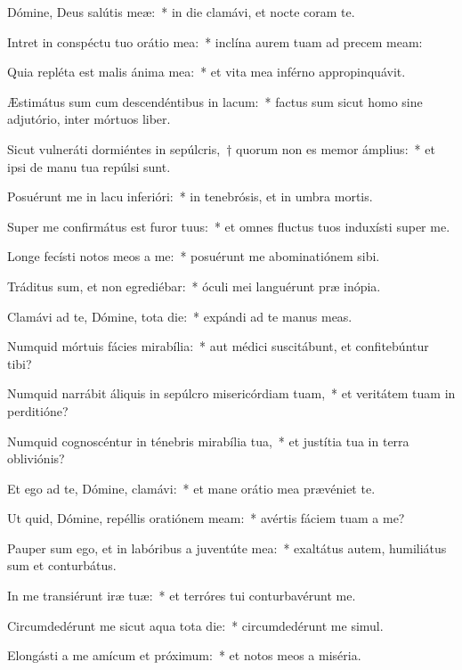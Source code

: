 \item Dómine, Deus salútis meæ:~* in die clamávi, et nocte coram te.

\item Intret in conspéctu tuo orátio mea:~* inclína aurem tuam ad precem meam:

\item Quia repléta est malis ánima mea:~* et vita mea inférno appropinquávit.

\item Æstimátus sum cum descendéntibus in lacum:~* factus sum sicut homo sine adjutório, inter mórtuos liber.

\item Sicut vulneráti dormiéntes in sepúlcris,~† quorum non es memor ámplius:~* et ipsi de manu tua repúlsi sunt.

\item Posuérunt me in lacu inferióri:~* in tenebrósis, et in umbra mortis.

\item Super me confirmátus est furor tuus:~* et omnes fluctus tuos induxísti super me.

\item Longe fecísti notos meos a me:~* posuérunt me abominatiónem sibi.

\item Tráditus sum, et non egrediébar:~* óculi mei languérunt præ inópia.

\item Clamávi ad te, Dómine, tota die:~* expándi ad te manus meas.

\item Numquid mórtuis fácies mirabília:~* aut médici suscitábunt, et confitebúntur tibi?

\item Numquid narrábit áliquis in sepúlcro misericórdiam tuam,~* et veritátem tuam in perditióne?

\item Numquid cognoscéntur in ténebris mirabília tua,~* et justítia tua in terra obliviónis?

\item Et ego ad te, Dómine, clamávi:~* et mane orátio mea prævéniet te.

\item Ut quid, Dómine, repéllis oratiónem meam:~* avértis fáciem tuam a me?

\item Pauper sum ego, et in labóribus a juventúte mea:~* exaltátus autem, humiliátus sum et conturbátus.

\item In me transiérunt iræ tuæ:~* et terróres tui conturbavérunt me.

\item Circumdedérunt me sicut aqua tota die:~* circumdedérunt me simul.

\item Elongásti a me amícum et próximum:~* et notos meos a miséria.

